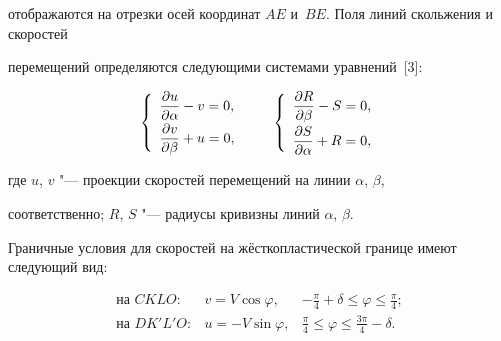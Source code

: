 отображаются на отрезки осей координат $AE$ и~$BE$. Поля линий скольжения и скоростей 

перемещений определяются следующими системами уравнений~[3]:

\begin{equation}

\label{khromov:eq3}

\left\{ {\begin{array}{l}

\displaystyle

 \frac{\partial u}{\partial \alpha } - v = 0, \vspace{1mm}\\

\displaystyle 

 \frac{\partial v}{\partial \beta } + u = 0, \\ 

 \end{array}} \right.\qquad 

\left\{ {\begin{array}{l}

\displaystyle

 \frac{\partial R}{\partial \beta } - S = 0, \vspace{1mm}\\ 

\displaystyle

 \frac{\partial S}{\partial \alpha } + R = 0, \\ 

 \end{array}} \right.

\end{equation}

где $u$, $v$ "--- проекции скоростей перемещений на линии $\alpha$, $\beta $, 

соответственно; $R$, $S$ "--- радиусы кривизны линий $\alpha$, $\beta $. 



Граничные условия для скоростей на жёсткопластической границе имеют следующий вид:

\begin{equation}

\label{khromov:eq4}

\begin{array}{lll}

 \text{на $CKLO$}: & v = V\cos \varphi, & - \frac{\pi }{4} + \delta \leqslant \varphi \leqslant \frac{\pi }{4}; \\ 

 \text{на $D{K}'{L}'O$}: & u = - V\sin \varphi, & \frac{\pi }{4} \leqslant \varphi \leqslant \frac{3\pi }{4} - \delta . 

 \end{array}

\end{equation}



